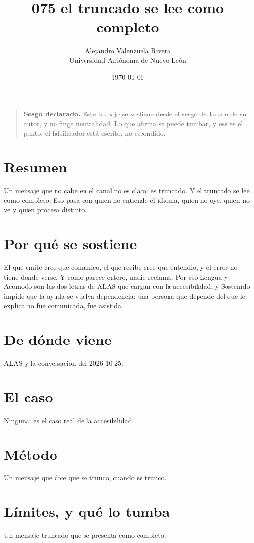 \documentclass[11pt,a4paper]{article}
\title{075 el truncado se lee como completo}
\author{Alejandro Valenzuela Rivera\\\small Universidad Autónoma de Nuevo León}
\date{\today}
\begin{document}
\maketitle

\begin{quote}
\textbf{Sesgo declarado.} Este trabajo se sostiene desde el sesgo declarado de su autor, y no finge neutralidad. Lo que afirma se puede tumbar, y ese es el punto: el falsificador está escrito, no escondido.
\end{quote}

\section*{Resumen}
Un mensaje que no cabe en el canal no es claro: es truncado. Y el truncado se lee como completo. Eso pasa con quien no entiende el idioma, quien no oye, quien no ve y quien procesa distinto.

\section{Por qué se sostiene}
El que emite cree que comunico, el que recibe cree que entendio, y el error no tiene donde verse. Y como parece entero, nadie reclama. Por eso Lengua y Acomodo son las dos letras de ALAS que cargan con la accesibilidad, y Sostenido impide que la ayuda se vuelva dependencia: una persona que depende del que le explica no fue comunicada, fue asistida.

\section{De dónde viene}
ALAS y la conversacion del 2026-10-25.

\section{El caso}
Ninguna: es el caso real de la accesibilidad.

\section{Método}
Un mensaje que dice que se trunco, cuando se trunco.

\section{Límites, y qué lo tumba}
Un mensaje truncado que se presenta como completo.
\end{document}
